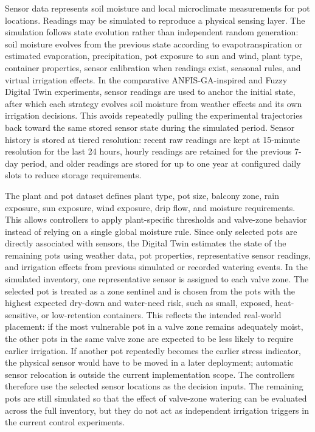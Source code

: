 \par Sensor data represents soil moisture and local microclimate measurements for pot
    locations. Readings may be simulated to reproduce a physical sensing layer. The
    simulation follows state evolution rather than independent random generation: soil
    moisture evolves from the previous state according to evapotranspiration or estimated
    evaporation, precipitation, pot exposure to sun and wind, plant type, container
    properties, sensor calibration when readings exist, seasonal rules, and virtual
    irrigation effects. In the comparative ANFIS-GA-inspired and Fuzzy Digital Twin
    experiments, sensor readings are used to anchor the initial state, after which each
    strategy evolves soil moisture from weather effects and its own irrigation decisions.
    This avoids repeatedly pulling the experimental trajectories back toward the same
    stored sensor state during the simulated period. Sensor history is stored at tiered
    resolution: recent raw readings are kept at 15-minute resolution for the last 24
    hours, hourly readings are retained for the previous 7-day period, and older readings
    are stored for up to one year at configured daily slots to reduce storage
    requirements.

\par The plant and pot dataset defines plant type, pot size, balcony zone, rain exposure,
    sun exposure, wind exposure, drip flow, and moisture requirements. This allows
    controllers to apply plant-specific thresholds and valve-zone behavior instead of
    relying on a single global moisture rule. Since only selected pots are directly
    associated with sensors, the Digital Twin estimates the state of the remaining pots
    using weather data, pot properties, representative sensor readings, and irrigation
    effects from previous simulated or recorded watering events. In the simulated
    inventory, one representative sensor is assigned to each valve zone. The selected pot
    is treated as a zone sentinel and is chosen from the pots with the highest expected
    dry-down and water-need risk, such as small, exposed, heat-sensitive, or low-retention
    containers. This reflects the intended real-world placement: if the most vulnerable
    pot in a valve zone remains adequately moist, the other pots in the same valve zone
    are expected to be less likely to require earlier irrigation. If another pot
    repeatedly becomes the earlier stress indicator, the physical sensor would have to be
    moved in a later deployment; automatic sensor relocation is outside the current
    implementation scope. The controllers therefore use the selected sensor locations as
    the decision inputs. The remaining pots are still simulated so that the effect of
    valve-zone watering can be evaluated across the full inventory, but they do not act
    as independent irrigation triggers in the current control experiments.

